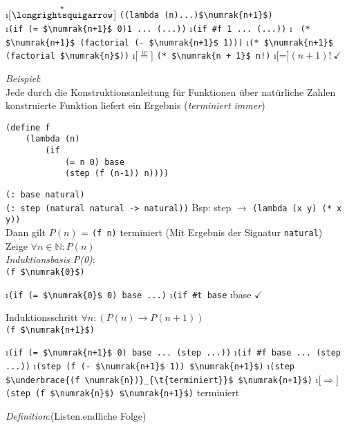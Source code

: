 \begin{enumerate}[\eval]
\i[$\overset{\star}{\text{\eval}}$] \lstinline[mathescape]|((lambda (n)...)$\numrak{n+1}$)|\\
\i \lstinline[mathescape]|(if (= $\numrak{n+1}$ 0)1 ... (...))|
\i \lstinline[]|(if #f|\lstinline| 1 ... (...))|
\i \ \marginpar{\flushleft \textcolor{red}{Unter der Annahme, dass tatsächlich Subtraktion implementiert ist}} \lstinline[mathescape]|(* $\numrak{n+1}$ (factorial (- $\numrak{n+1}$ 1)))|
\i \lstinline[mathescape]|(* $\numrak{n+1}$ (factorial $\numrak{n}$))|
\i[$\overset{iv}{=}$] \lstinline[mathescape]|(* $\numrak{n + 1}$ n!)|
\i[=]$(n+1)!\ \checkmark$
\end{enumerate}
\emph{Beispiel}:\\
Jede durch die Konstruktionsanleitung für Funktionen über natürliche Zahlen konstruierte Funktion liefert ein Ergebnis ({\em terminiert immer})\\
\begin{lstlisting}
(define f
	(lambda (n)
		(if
			(= n 0) base
			(step (f (n-1)) n))))
\end{lstlisting}
\lstinline|(: base natural)|\\
\lstinline|(: step (natural natural -> natural))|
Bsp: step $\rightarrow$ \lstinline|(lambda (x y) (* x y))|\\
Dann gilt $P(n)$ = \lstinline!(f n)! terminiert (Mit Ergebnis der Signatur \lstinline!natural!)\\
Zeige $\forall n \in \mathbb{N} : P(n)$\\
\emph{Induktionsbasis P(0)}:\\
\lstinline[mathescape]|(f $\numrak{0}$)|
\begin{enumerate}[\eval]
\i \lstinline[mathescape]|(if (= $\numrak{0}$ 0) base ...)|
\i \lstinline[]|(if #t base|
\i base $\checkmark $
\end{enumerate}
Induktionsschritt $\forall n : (P(n) \rightarrow P(n+1))$\\
\lstinline[mathescape]|(f $\numrak{n+1}$)|
\begin{enumerate}[\eval]
	\i \lstinline[mathescape]|(if (= $\numrak{n+1}$ 0) base ... (step ...))|
	\i \lstinline[]|(if #f|\lstinline| base ... (step ...))|
	\i \lstinline[mathescape]|(step (f (- $\numrak{n+1}$ 1)) $\numrak{n+1}$)|
	\i \lstinline[mathescape]|(step $\underbrace{(f \numrak{n})}_{\t{terminiert}}$ $\numrak{n+1}$)|
	\i[$\Rightarrow$]\lstinline[mathescape]!(step (f $\numrak{n}$) $\numrak{n+1}$)! terminiert
\end{enumerate}
\emph{Definition}:(Listen.endliche Folge)\\
